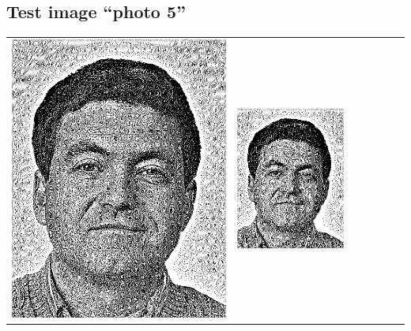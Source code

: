 \subsection{Test image ``photo 5''}
\begin{tabular}{lllllll}
	\includegraphics{Ediphoto-5-1.png} &
	\includegraphics{Ediphoto-5-2.png} &

\end{tabular}

